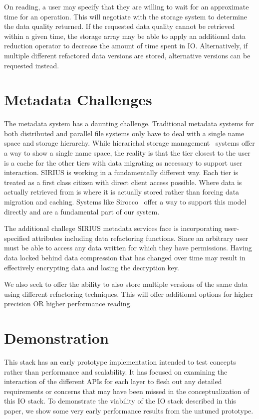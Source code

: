 \documentclass[letterpaper,twocolumn,10pt]{article}
\begin{document}
On reading, a user may specify that they are willing to wait for an approximate
time for an operation. This will negotiate with the storage system to determine
the data quality returned. If the requested data quality cannot be retrieved
within a given time, the storage array may be able to apply an additional
data reduction operator to decrease the amount of time spent in IO.
Alternatively, if multiple different refactored data versions are stored,
alternative versions can be requested instead.

\section{Metadata Challenges}
\label{sec:metadata}

The metadata system has a daunting challenge. Traditional metadata systems for
both distributed and parallel file systems only have to deal with a single name
space and storage hierarchy. While hierarichal storage management~\cite{blaze:1992:hsm}
systems offer a way to show a single name space, the reality is that the tier
closest to the user is a cache for the other tiers with data migrating as
necessary to support user interaction. SIRIUS is working in a fundamentally
different way. Each tier is treated as a first class citizen with direct
client access possible. Where data is actually retrieved from is where it is
actually stored rather than forcing data migration and caching. Systems like
Sirocco~\cite{curry:2015:sirocco} offer a way to support this model directly and are a
fundamental part of our system.

The additional challege SIRIUS metadata services face is incorporating
user-specified attributes including data refactoring functions. Since an
arbitrary user must be able to access any data written for which they have
permissions. Having data locked behind data compression that has changed over
time may result in effectively encrypting data and losing the decryption key.

We also seek to offer the ability to also store multiple versions of the same
data using different refactoring techniques. This will offer additional options
for higher precision OR higher performance reading.

\section{Demonstration}
\label{sec:evaluation}

This stack has an early prototype implementation intended to test concepts
rather than performance and scalability. It has focused on examining the
interaction of the different APIs for each layer to flesh out any detailed
requirements or concerns that may have been missed in the conceptualization of
this IO stack. To demonstrate the viability of the IO stack described in this
paper, we show some very early performance results from the untuned prototype.
\end{document}
